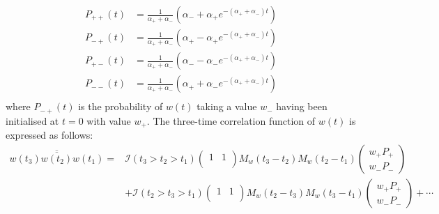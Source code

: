 \documentclass[%
 amsmath,amssymb,
]{revtex4-2}
\newcommand{\Overline}[1]{\overline{\overline{#1}}}
\begin{document}
\begin{equation}\label{elements}
    \begin{split}
        P_{++}(t) &= \frac{1}{\alpha_+ + \alpha_-} \left(\alpha_- + \alpha_+ e^{-(\alpha_+ + \alpha_-)t}\right) \\
        P_{-+}(t) &= \frac{1}{\alpha_+ + \alpha_-} \left(\alpha_+ - \alpha_+ e^{-(\alpha_+ + \alpha_-)t}\right) \\
        P_{+-}(t) &= \frac{1}{\alpha_+ + \alpha_-} \left(\alpha_- - \alpha_- e^{-(\alpha_+ + \alpha_-)t}\right) \\
        P_{--}(t) &= \frac{1}{\alpha_+ + \alpha_-} \left(\alpha_+ + \alpha_- e^{-(\alpha_+ + \alpha_-)t}\right) \\
    \end{split}
\end{equation}
where $P_{-+}(t)$ is the probability of $w(t)$ taking a value $w_-$ having been initialised at $t=0$ with value $w_+$. The three-time correlation function of $w(t)$ is expressed as follows:
\begin{equation}\label{3time}
\begin{split}
    \Overline{w(t_3)w(t_2)w(t_1)} =& \mathcal{I}(t_3>t_2>t_1)
 \begin{pmatrix}
1 & 1\\
\end{pmatrix}
M_{w}(t_3-t_{2})M_{w}(t_2-t_{1})
\begin{pmatrix}
w_+P_{+}\\
w_-P_{-}
\end{pmatrix}\\
&+\mathcal{I}(t_2>t_3>t_1)
 \begin{pmatrix}
1 & 1\\
\end{pmatrix}
M_{w}(t_2-t_{3})M_{w}(t_3-t_{1})
\begin{pmatrix}
w_+P_{+}\\
w_-P_{-}
\end{pmatrix} + \cdots
\end{split}
\end{equation}
\end{document}
